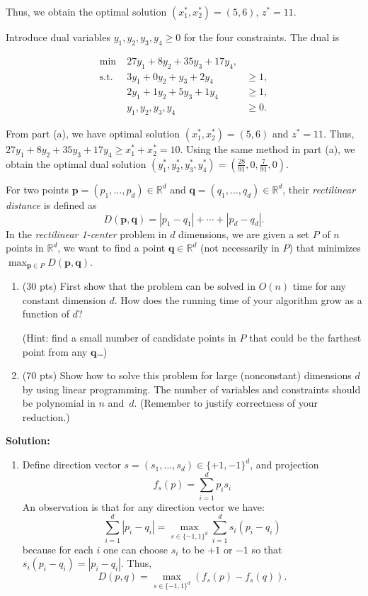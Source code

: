 \documentclass[11pt]{article}
\begin{document}
\begin{description}
Thus, we obtain the optimal solution \((x_1^*, x_2^*) = (5, 6)\), \(z^* = 11\). 

\item[(b)]

Introduce dual variables \(y_1,y_2,y_3,y_4\ge0\) for the four constraints.  The dual is

\[
\begin{array}{rrr}
\min\;&27y_1 +8y_2 +35y_3 +17y_4,&\\
\text{s.t.}\;&3y_1 + 0y_2 + y_3 +2y_4 &\ge1,\\
&2y_1 +1y_2 +5y_3 + 1y_4 &\ge1,\\
&y_1, y_2, y_3, y_4 &\ge0.
\end{array}
\]

From part (a), we have optimal solution \((x_1^*, x_2^*) = (5, 6)\) and \(z^* = 11\).
Thus, \(27y_1 +8y_2 +35y_3 +17y_4 \ge x_1^* + x_2^* = 10\).
Using the same method in part (a), we obtain the optimal dual solution
\((y_1^*, y_2^*, y_3^*, y_4^*) = (\frac{28}{91}, 0, \frac{7}{91}, 0)\).

\newpage
\item[Problem 8.2:]
For two points $\mathbf{p}=(p_1,\ldots,p_d)\in \mathbb{R}^d$ and 
$\mathbf{q}=(q_1,\ldots,q_d)\in \mathbb{R}^d$,
their \emph{rectilinear distance} is defined as 
$$D(\mathbf{p},\mathbf{q})=|p_1-q_1|+\cdots+|p_d-q_d|.$$
In the {\em rectilinear 1-center} problem in $d$ dimensions,
we are given a set $P$ of $n$ points in $\mathbb{R}^d$,
we want to find a point $\mathbf{q}\in \mathbb{R}^d$ (not necessarily in $P$)
that minimizes $\max_{\mathbf{p}\in P} D(\mathbf{p},\mathbf{q})$.

\begin{enumerate}
\item[(a)] (30 pts)
First show that the problem can be solved in $O(n)$ time for
any constant dimension $d$.  How does the running time of your
algorithm grow as a function of $d$?

(Hint: find a small number of candidate points in $P$ that could be the 
farthest point from any $\mathbf{q}$\ldots)
\item[(b)] (70 pts)
Show how to solve this problem for large (nonconstant) dimensions $d$ by
using linear programming.
The number of variables and constraints should be polynomial in $n$
and~$d$.  (Remember to justify correctness of your reduction.)
\end{enumerate}

\newpage
\textbf{Solution:}
\begin{enumerate}
  \item[(a)]
  Define direction vector $s=(s_1,\dots,s_d)\in\{+1,-1\}^d$, and projection
  \[
  f_s(p)=\sum_{i=1}^{d}p_i s_i
  \]
  An observation is that for any direction vector we have:
  \[
  \sum_{i=1}^d |p_i - q_i| = \max_{s\in \{-1,1\}^d} \sum_{i=1}^d s_i (p_i - q_i)
  \]
  because for each $i$ one can choose $s_i$ to be $+1$ or $-1$ so that $s_i(p_i - q_i)=|p_i-q_i|$. Thus,
  \[
  D(p, q) = \max_{s\in \{-1,1\}^d} (f_s(p) - f_s(q)).
  \]


\end{enumerate}
\end{description}
\end{document}
